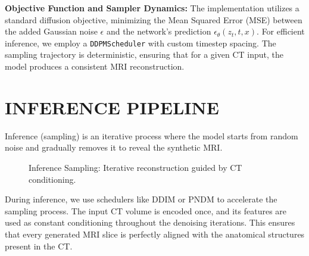 \documentclass[10pt,a4paper]{article}
\begin{document}
\textbf{Objective Function and Sampler Dynamics:} 
The implementation utilizes a standard diffusion objective, minimizing the Mean Squared Error (MSE) between the added Gaussian noise $\epsilon$ and the network's prediction $\epsilon_\theta(z_t, t, x)$. For efficient inference, we employ a \texttt{DDPMScheduler} with custom timestep spacing. The sampling trajectory is deterministic, ensuring that for a given CT input, the model produces a consistent MRI reconstruction.

\section{INFERENCE PIPELINE}
Inference (sampling) is an iterative process where the model starts from random noise and gradually removes it to reveal the synthetic MRI.

\begin{figure}[H]
\centering
{}
\caption{Inference Sampling: Iterative reconstruction guided by CT conditioning.}
\end{figure}

During inference, we use schedulers like DDIM or PNDM to accelerate the sampling process. The input CT volume is encoded once, and its features are used as constant conditioning throughout the denoising iterations. This ensures that every generated MRI slice is perfectly aligned with the anatomical structures present in the CT.
\end{document}
